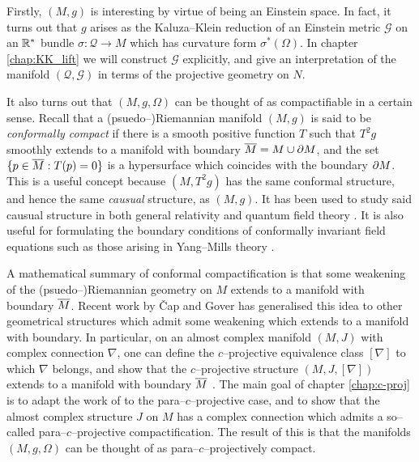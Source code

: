 
Firstly, $(M,g)$ is interesting by virtue of being an Einstein
space. In fact, it turns out that $g$ arises as the Kaluza--Klein reduction of an Einstein metric $\mathcal{G}$ on an $\mathbb{R}^*$ bundle $\sigma:\mathcal{Q}\rightarrow M$ which has curvature form $\sigma^*(\Omega)$. In chapter \ref{chap:KK_lift} we will construct $\mathcal{G}$ explicitly, and give an interpretation of the manifold $(\mathcal{Q},\mathcal{G})$ in terms of the projective geometry on $N$.

It also turns out that $(M,g,\Omega)$ can be thought of as compactifiable in a certain sense. Recall that a (psuedo--)Riemannian manifold $(M,g)$ is said to be \textit{conformally compact} if there is a smooth positive function $T$ such that $T^2g$ smoothly extends to a manifold with boundary $\overline{M}=M\cup\partial M$, and the set $\{p\in\overline{M}:T(p)=0\}$ is a hypersurface which coincides with the boundary $\partial M$.  This is a useful concept because $(M,T^2g)$ has the same conformal structure, and hence the same \textit{causual} structure, as $(M,g)$. It has been used to study said causual structure in both general relativity \cite{penrose65} and quantum field theory \cite{witten}. It is also useful for formulating the boundary conditions of conformally invariant field equations such as those arising in Yang--Mills theory \cite{uhlen}.

A mathematical summary of conformal compactification is that some weakening of the (psuedo--)Riemannian geometry on $M$ extends to a manifold with boundary $\overline{M}$. Recent work by \v Cap and Gover \cite{CG0,CG} has generalised this idea to other geometrical structures which admit some weakening which extends to a manifold with boundary. In particular, on an almost complex manifold $(M,J)$ with complex connection $\nabla$, one can define the $c$--projective equivalence class $[\nabla]$ to which $\nabla$ belongs, and show that the $c$--projective structure $(M,J,[\nabla])$ extends to a manifold with boundary $\overline{M}$ \cite{CG}. The main goal of chapter \ref{chap:c-proj} is to adapt the work of \cite{CG} to the para--$c$--projective case, and to show that the almost complex structure $J$ on $M$ has a complex connection which admits a so--called para--$c$--projective compactification. The result of this is that the manifolds $(M,g,\Omega)$ can be thought of as para--$c$--projectively compact.

